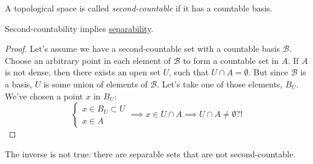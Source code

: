 \begin{definition}
    A topological space is called \textit{second-countable} if it has a countable basis.
\end{definition}

\begin{proposition}
    Second-countability implies
    \hyperref[def:separable]{separability}.
\end{proposition}
\begin{proof}
    Let's assume we have a second-countable set with a countable basis $\mathcal{B}$.
    Choose an arbitrary point in each element of $\mathcal{B}$ to form
    a countable set in $A$. If $A$ is not dense,
    then there exists an open set $U$, such that $U \cap A = \emptyset$.
    But since $\mathcal{B}$ is a basis, $U$ is some union of elements of 
    $\mathcal{B}$. Let's take one of those elements, $B_U$.
    We've chosen a point $x$ in $B_U$:
    \[
        \begin{cases}
            x \in B_U \subset U\\
            x \in A
        \end{cases} \implies
        x \in U \cap A \implies U \cap A \ne \emptyset \text{?!}
    \]
\end{proof}
\begin{remark}
    The inverse is not true: there are separable sets that are not second-countable.
\end{remark}

